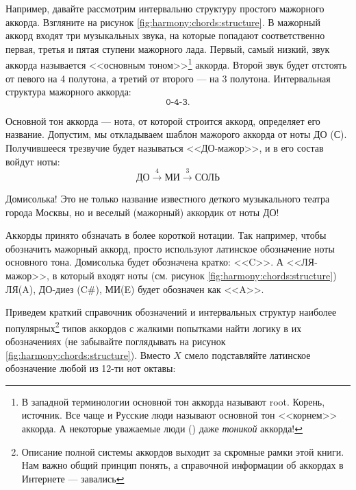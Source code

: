 Например, давайте рассмотрим интервальню структуру простого мажорного аккорда. Взгляните на рисунок \ref{fig:harmony:chords:structure}. В мажорный аккорд входят три музыкальных звука, на которые попадают соответственно первая, третья и пятая ступени мажорного лада. Первый, самый низкий, звук аккорда называется <<основным тоном>>\footnote{В западной терминологии основной тон аккорда называют root. Корень, источник. Все чаще и Русские люди называют основной тон <<корнем>> аккорда. А некоторые уважаемые люди (\cite{url:pimalive}) даже \emph{тоникой} аккорда!} аккорда. Второй звук будет отстоять от певого на 4 полутона, а третий от второго --- на 3 полутона. Интервальная структура мажорного аккорда:
\[
    \texttt{0-4-3}.
\]

Основной тон аккорда --- нота, от которой строится аккорд, определяет его название. Допустим, мы откладываем шаблон мажорого аккорда от ноты ДО (С). Получившееся трезвучие будет называться <<ДО-мажор>>, и в его состав войдут ноты: 
\[
    \text{ДО}\xrightarrow{4}
    \text{МИ}\xrightarrow{3}
    \text{СОЛЬ}
\]

Домисолька! Это не только название известного деткого музыкального театра города Москвы, но и веселый (мажорный) аккордик от ноты ДО! 

Аккорды принято обзначать в более короткой нотации. Так например, чтобы обозначить мажорный аккорд, просто используют латинское обозначение ноты основного тона. Домисолька будет обозначена кратко: <<C>>. А <<ЛЯ-мажор>>, в который входят ноты (см. рисунок \ref{fig:harmony:chords:structure}) ЛЯ(A), ДО-диез (C\#), МИ(E) будет обозначен как <<A>>.

Приведем краткий справочник обозначений и интервальных структур наиболее популярных\footnote{Описание полной системы аккордов выходит за скромные рамки этой книги. Нам важно общий принцип понять, а справочной информации об аккордах в Интернете --- завались} типов аккордов с жалкими попытками найти логику в их обозначениях (не забывайте поглядывать на рисунок \ref{fig:harmony:chords:structure}). Вместо $X$ смело подставляйте латинское обозначение любой из 12-ти нот октавы:

